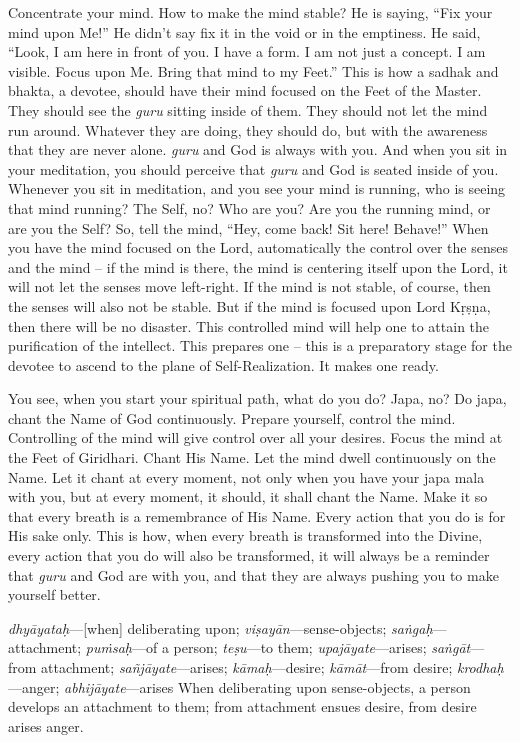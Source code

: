 Concentrate your mind. How to make the mind stable? He is saying, “Fix your mind upon Me!” He didn’t say fix it in the void or in the emptiness. He said, “Look, I am here in front of you. I have a form. I am not just a concept. I am visible. Focus upon Me. Bring that mind to my Feet.” This is how a sadhak and bhakta, a devotee, should have their mind focused on the Feet of the Master. They should see the \textit{guru} sitting inside of them. They should not let the mind run around. Whatever they are doing, they should do, but with the awareness that they are never alone. \textit{guru} and God is always with you. And when you sit in your meditation, you should perceive that \textit{guru} and God is seated inside of you. Whenever you sit in meditation, and you see your mind is running, who is seeing that mind running? The Self, no? Who are you? Are you the running mind, or are you the Self? So, tell the mind, “Hey, come back! Sit here! Behave!” When you have the mind focused on the Lord, automatically the control over the senses and the mind – if the mind is there, the mind is centering itself upon the Lord, it will not let the senses move left-right. If the mind is not stable, of course, then the senses will also not be stable. But if the mind is focused upon Lord Kṛṣṇa, then there will be no disaster. This controlled mind will help one to attain the purification of the intellect. This prepares one – this is a preparatory stage for the devotee to ascend to the plane of Self-Realization. It makes one ready.

You see, when you start your spiritual path, what do you do? Japa, no? Do japa, chant the Name of God continuously. Prepare yourself, control the mind. Controlling of the mind will give control over all your desires. Focus the mind at the Feet of Giridhari. Chant His Name. Let the mind dwell continuously on the Name. Let it chant at every moment, not only when you have your japa mala with you, but at every moment, it should, it shall chant the Name. Make it so that every breath is a remembrance of His Name. Every action that you do is for His sake only. This is how, when every breath is transformed into the Divine, every action that you do will also be transformed, it will always be a reminder that \textit{guru} and God are with you, and that they are always pushing you to make yourself better.

{%
  \textit{dhyāyataḥ}---[when] deliberating upon; 
  \textit{viṣayān}---sense-objects; 
  \textit{saṅgaḥ}---attachment; 
  \textit{puṁsaḥ}---of a person; 
  \textit{teṣu}---to them; 
  \textit{upajāyate}---arises; 
  \textit{saṅgāt}---from attachment; 
  \textit{sañjāyate}---arises; 
  \textit{kāmaḥ}---desire; 
  \textit{kāmāt}---from desire; 
  \textit{krodhaḥ}---anger; 
  \textit{abhijāyate}---arises
}
{%
  When deliberating upon sense-objects, a person develops an attachment to them; from attachment ensues desire, from desire arises anger.
}

